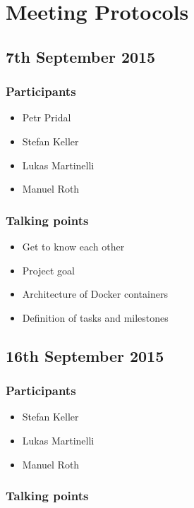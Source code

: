 \chapter*{Meeting Protocols}

\section*{7th September 2015}

\subsection*{Participants}
\begin{itemize}
  \item Petr Pridal
  \item Stefan Keller
  \item Lukas Martinelli
  \item Manuel Roth
\end{itemize}


\subsection*{Talking points}

\begin{itemize}
  \item Get to know each other
  \item Project goal
  \item Architecture of Docker containers
  \item Definition of tasks and milestones
\end{itemize}

\section*{16th September 2015}

\subsection*{Participants}

\begin{itemize}
  \item Stefan Keller
  \item Lukas Martinelli
  \item Manuel Roth
\end{itemize}


\subsection*{Talking points}

